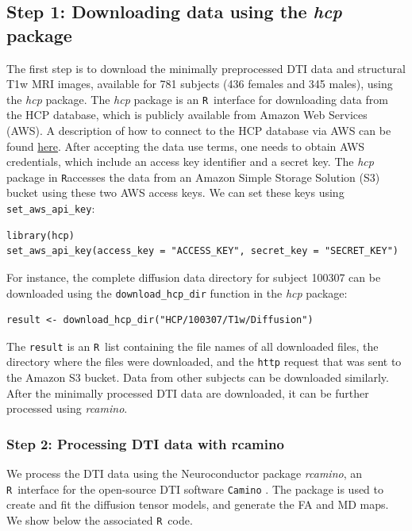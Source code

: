 \documentclass[]{elsarticle} %
\newcommand{\code}[1]{\texttt{#1}}
\newcommand{\pkg}[1]{\emph{#1}}
\newcommand{\rlang}{\texttt{R}}
\begin{document}
\subsection{Step 1: Downloading data using the \pkg{hcp} package}
The first step is to download the minimally preprocessed DTI data \citep{hcpminimal} and structural T1w MRI images, available  for 781 subjects (436 females and 345 males), using the \pkg{hcp} \citep{hcp} package.  The \pkg{hcp} package is an \rlang~interface for downloading data from the HCP database, which is publicly available from Amazon Web Services (AWS). A description of how to connect to the HCP database via AWS can be found \href{https://wiki.humanconnectome.org/display/PublicData/How+To+Connect+to+Connectome+Data+via+AWS}{here}.  After accepting the data use terms, one needs to obtain AWS credentials, which include an access key identifier and a secret  key. The \pkg{hcp} package in \rlang accesses the data from an Amazon Simple Storage Solution (S3) bucket using these two AWS access keys.  We can set these keys using \code{set\_aws\_api\_key}:
\color{blue}
\begin{verbatim}
library(hcp)
set_aws_api_key(access_key = "ACCESS_KEY", secret_key = "SECRET_KEY")
\end{verbatim}
\color{black}
For instance, the complete diffusion data directory for subject 100307 can be downloaded using the \code{download\_hcp\_dir} function in the \pkg{hcp} package:
\color{blue}
\begin{verbatim}
result <- download_hcp_dir("HCP/100307/T1w/Diffusion")
\end{verbatim}
\color{black}
The \code{result} is an \rlang\, list containing the file names of all downloaded files, the directory where the files were downloaded, and the \texttt{http} request that was sent to the Amazon S3 bucket. Data from other subjects can be downloaded similarly. After the minimally processed DTI data are downloaded, it can be further processed using \pkg{rcamino}. 

\subsubsection{Step 2: Processing DTI data with rcamino}

We process the DTI data using the Neuroconductor package \pkg{rcamino}, an \rlang~interface for the open-source DTI software \texttt{Camino} \citep{camino}. The package is used to create and fit the diffusion tensor models, and generate the FA and MD maps. We show below the associated \rlang~code. 
\end{document}
